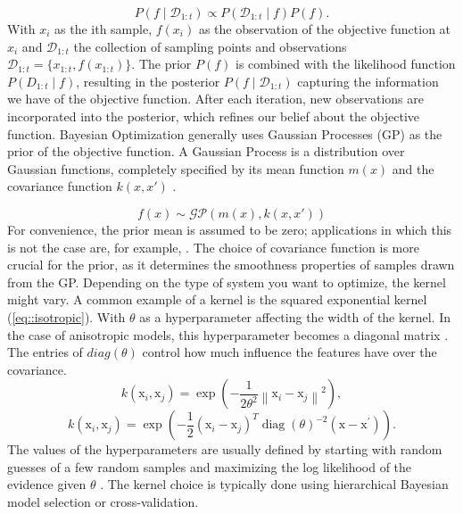 \begin{equation}
P(f \mid \mathcal{D}_{1:t}) \propto P(\mathcal{D}_{1:t}\mid f) P(f) .
\end{equation}
With $x_i$ as the ith sample, $f(x_i)$ as the observation of the objective function at $x_i$ and $\mathcal{D}_{1:t}$ the collection of sampling points and observations $\mathcal{D}_{1:t} = \{x_{1:t},f(x_{1:t})\}$. The prior $P(f)$ is combined with the likelihood function $P(D_{1:t}\mid f)$, resulting in the posterior $P(f \mid \mathcal{D}_{1:t})$ capturing the information we have of the objective function. After each iteration, new observations are incorporated into the posterior, which refines our belief about the objective function. Bayesian Optimization generally uses Gaussian Processes (GP) as the prior of the objective function. A Gaussian Process is a distribution over Gaussian functions, completely specified by its mean function $m(x)$ and the covariance function $k(x,x')$ \cite{bo_tutorial}. 

\begin{equation}
    f(x) \sim \mathcal{GP}(m(x), k(x,x'))
\end{equation}
For convenience, the prior mean is assumed to be zero; applications in which this is not the case are, for example, \cite{MartinezCantin, Brochu2010}. The choice of covariance function is more crucial for the prior, as it determines the smoothness properties of samples drawn from the GP. Depending on the type of system you want to optimize, the kernel might vary. A common example of a kernel is the squared exponential kernel (\ref{eq::isotropic}). With $\theta$ as a hyperparameter affecting the width of the kernel. In the case of anisotropic models, this hyperparameter becomes a diagonal matrix \cite{rasmussen2006gaussian}. The entries of $diag(\theta)$ control how much influence the features have over the covariance.
\begin{equation}\label{eq::isotropic}
k\left(\mathrm{x}_i, \mathrm{x}_j\right)=\exp \left(-\frac{1}{2 \theta^2}\left\|\mathrm{x}_i-\mathrm{x}_j\right\|^2\right),
\end{equation}
\begin{equation}\label{eq::anistropic}
k\left(\mathrm{x}_i, \mathrm{x}_j\right)=\exp \left(-\frac{1}{2}\left(\mathrm{x}_i-\mathrm{x}_j\right)^T \operatorname{diag}(\theta)^{-2}\left(\mathrm{x}-\mathrm{x}^{\prime}\right)\right).
\end{equation}
The values of the hyperparameters are usually defined by starting with random guesses of a few random samples and maximizing the log likelihood of the evidence given $\theta$ \cite{rasmussen2006gaussian, santner2003design}. The kernel choice is typically done using hierarchical Bayesian model selection \cite{mackay1992practical} or cross-validation. 

